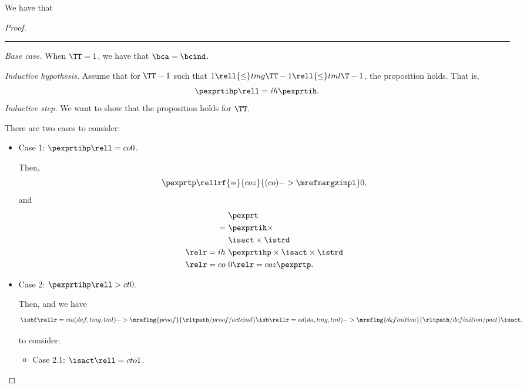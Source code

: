 \begin{proposition}
  \nrp
  We have that %
\end{proposition}

\begin{proof}
  \hrule
  \nrp
  {\it Base case.}
  When $\TT = 1$,
  we have  that
  $\bca = \bcind$.

  \serule
  \nrp
  {\it Inductive hypothesis.}
  Assume that for $\TT - 1$ such that $1 \rell {\le} tmg \TT - 1 \rell {\le} tml \T - 1$,
  the proposition holds. That is,
  $$ \pexprtihp \rell = ih \pexprtih.$$%
  \srule
  \nrp
  {\it Inductive step.}
  We want to show that the proposition holds for $\TT.$

  \nrp
  There are two cases to consider:
  \begin{itemize}
    \item \nrp Case 1: $\pexprtihp \rell = co 0$. 

      \nrp
      Then,
      $$\pexprtp  \rellrf{=}{coz}{(co)->\mrefmargzimpl} 0,$$
      \nrp
      and
      \begin{align*}
        &\pexprt \\
        =\ &\pexprtih \times \\
        &\isact \times \istrd\\
        \relr = ih \ & \pexprtihp \times \isact \times \istrd \\
        \relr = co \ & 0 \relr = coz \pexprtp.
      \end{align*}
    \item \nrp Case 2: $\pexprtihp \rell > ct 0$. 

      \nrp
      Then, 
      \nrp
      and we have
      $$\isbf \rellr = cia (daf,tmg,tml)->\mreflng{proof}{\rltpath/proof/actcind} \isb 
      \rellr = ad (da,tmg,tml)->\mreflng{definition}{\rltpath/definition/pact} \isact.$$

      \nrp
       to consider:
      \begin{itemize}
        \item \nrp Case 2.1: $\isact \rell = cto 1$.


\end{itemize}
\end{itemize}
\end{proof}
